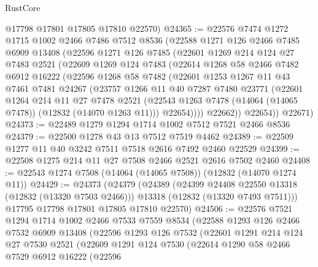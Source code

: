 \begin{lexlean}{RustCore}
\begin{coremodule}
      @17798
      @17801
      @17805
      @17810
      @22570)
@24365 := @22576
    @7474
    @1272
    @1715
    @1002
    @2466
    @7486
    @7512
    @8536
    (@22588
      @1271
      @126
      @2466
      @7485
      @6909
      @13408
      (@22596
        @1271
        @126
        @7485
        (@22601
          @1269
          @214
          @124
          @27
          @7483
          @2521
          (@22609
            @1269
            @124
            @7483
            (@22614
              @1268
              @58
              @2466
              @7482
              @6912
              @16222
              (@22596
                @1268
                @58
                @7482
                (@22601
                  @1253
                  @1267
                  @11
                  @43
                  @7461
                  @7481
                  @24267
                  (@23757
                    @1266
                    @11
                    @40
                    @7287
                    @7480
                    @23771
                    (@22601
                      @1264
                      @214
                      @11
                      @27
                      @7478
                      @2521
                      (@22543 @1263 @7478 (@14064 (@14065 @7478)) (@12832 (@14070 @1263 @11)))
                      @22654))))
              @22662))
          @22654))
      @22671)
@24373 := @22489 @1279 @1294 @1714 @1002 @7512 @7521 @2466 @8536
@24379 := @22500 @1278 @43 @13 @7512 @7519 @4462
@24389 := @22509 @1277 @11 @40 @3242 @7511 @7518 @2616 @7492 @2460 @22529
@24399 := @22508 @1275 @214 @11 @27 @7508 @2466 @2521 @2616 @7502 @2460
@24408 := @22543 @1274 @7508 (@14064 (@14065 @7508)) (@12832 (@14070 @1274 @11))
@24429 := @24373
    (@24379
      (@24389
        (@24399 @24408 @22550 @13318 (@12832 (@13320 @7503 @2466)))
        @13318
        (@12832 (@13320 @7493 @7511)))
      @17795
      @17798
      @17801
      @17805
      @17810
      @22570)
@24506 := @22576
    @7521
    @1294
    @1714
    @1002
    @2466
    @7533
    @7559
    @8534
    (@22588
      @1293
      @126
      @2466
      @7532
      @6909
      @13408
      (@22596
        @1293
        @126
        @7532
        (@22601
          @1291
          @214
          @124
          @27
          @7530
          @2521
          (@22609
            @1291
            @124
            @7530
            (@22614
              @1290
              @58
              @2466
              @7529
              @6912
              @16222
              (@22596

\end{coremodule}
\end{lexlean}
